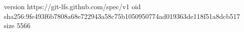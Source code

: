 version https://git-lfs.github.com/spec/v1
oid sha256:9fe493f6b7808a68e722943a58c75b1050950774ad019363de118f51a8dcb517
size 5566
